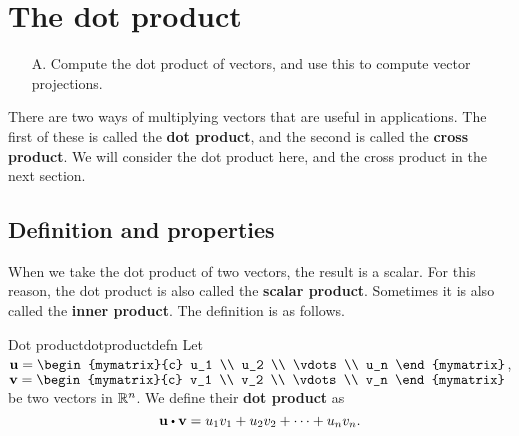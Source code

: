 \section{The dot product}

\begin{outcome}

\begin{enumerate}
\item[A.] Compute the dot product of vectors, and use this to compute vector projections.
\end{enumerate}
\end{outcome}

There are two ways of multiplying vectors that are useful in
applications. The first of these is called the \textbf{dot product},
and the second is called the \textbf{cross product}. We will consider
the dot product here, and the cross product in the next section.

\subsection{Definition and properties}

When we take the dot product of two vectors, the result is a
scalar. For this reason, the dot product is also called the
\textbf{scalar product}. Sometimes it is also called the \textbf{inner
  product}. The definition is as follows.  
  

\begin{definition}{Dot product}{dotproductdefn}
  Let $\vect{u}=\begin{mymatrix}{c}
    u_1 \\
    u_2 \\
    \vdots \\
    u_n 
  \end{mymatrix}$, $\vect{v}= \begin{mymatrix}{c}
    v_1 \\
    v_2 \\
    \vdots \\
    v_n 
  \end{mymatrix}$ be two vectors in $\mathbb{R}^{n}$. We
  define their \textbf{dot product} as
  \begin{equation*}
    \vect{u}\dotprod \vect{v} = u_1v_1+u_2v_2+\cdots+u_nv_n.
  \end{equation*}
\end{definition}

